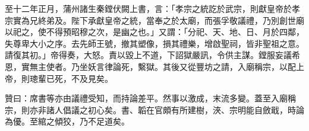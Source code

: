 \begin{pinyinscope}
至十二年正月，蒲州諸生秦鏜伏闕上書，言：「孝宗之統訖於武宗，則獻皇帝於孝宗實為兄終弟及。陛下承獻皇帝之統，當奉之於太廟，而張孚敬議禮，乃別創世廟以祀之，使不得預昭穆之次，是幽之也。」又謂：「分祀、天、地、日、月於四鄰，失尊卑大小之序。去先師王號，撤其塑像，損其禮樂，增啟聖祠，皆非聖祖之意。請復其初。」帝得奏，大怒。責以毀上不道，下詔獄嚴訊，令供主謀。鏜服妄議希恩，實無主使者。乃坐妖言律論死，繫獄。其後又從豐坊之請，入廟稱宗，以配上帝，則璁輩已死，不及見矣。

贊曰：席書等亦由議禮受知，而持論差平。然事以激成，末流多變。蓋至入廟稱宗，則亦非諸人倡議之初心矣。書、韜在官頗有所建樹，浹、宗明能自斂戢，時論為優。至綰之傾狡，乃不足道矣。


\end{pinyinscope}